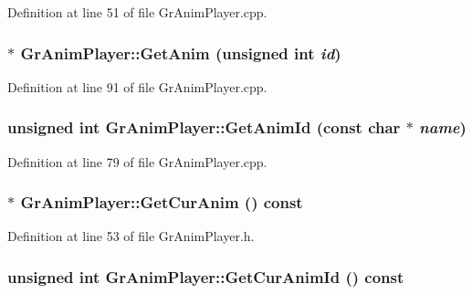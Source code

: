 \begin{CompactItemize}
Definition at line 51 of file GrAnimPlayer.cpp.\hypertarget{class_gr_anim_player_ced4497db4ff6a6b449c12229287a830}{
\subsubsection[{GetAnim}]{ $\ast$ GrAnimPlayer::GetAnim (unsigned int {\em id})}}
\label{class_gr_anim_player_ced4497db4ff6a6b449c12229287a830}




Definition at line 91 of file GrAnimPlayer.cpp.\hypertarget{class_gr_anim_player_7fc95790506d45f32efbcb9023606318}{
\subsubsection[{GetAnimId}]{\setlength{\rightskip}{0pt plus 5cm}unsigned int GrAnimPlayer::GetAnimId (const char $\ast$ {\em name})}}
\label{class_gr_anim_player_7fc95790506d45f32efbcb9023606318}




Definition at line 79 of file GrAnimPlayer.cpp.\hypertarget{class_gr_anim_player_2df1bb7e8c64335491c37aa32ede5b50}{
\subsubsection[{GetCurAnim}]{$\ast$ GrAnimPlayer::GetCurAnim () const}}
\label{class_gr_anim_player_2df1bb7e8c64335491c37aa32ede5b50}




Definition at line 53 of file GrAnimPlayer.h.\hypertarget{class_gr_anim_player_1c07ae13f8f25a0e5f04b80cfc74cd25}{
\subsubsection[{GetCurAnimId}]{\setlength{\rightskip}{0pt plus 5cm}unsigned int GrAnimPlayer::GetCurAnimId () const}}
\label{class_gr_anim_player_1c07ae13f8f25a0e5f04b80cfc74cd25}





\end{CompactItemize}
